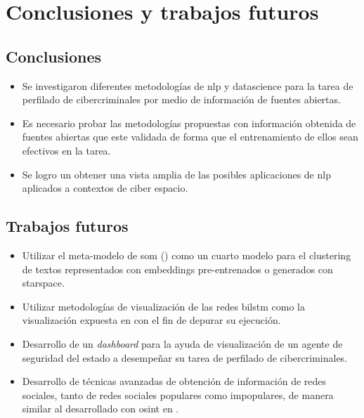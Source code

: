 \chapter{Conclusiones y trabajos futuros}

\label{chap:conclusions}

\section{Conclusiones}
\begin{itemize}
\item Se investigaron diferentes metodologías de \gls{nlp} y \gls{datascience} para la tarea de perfilado de cibercriminales por medio de información de fuentes abiertas.
\item Es necesario probar las metodologías propuestas con información obtenida de fuentes abiertas que este validada de forma que el entrenamiento de ellos sean efectivos en la tarea.
\item Se logro un obtener una vista amplia de las posibles aplicaciones de \gls{nlp} aplicados a contextos de ciber espacio.
\end{itemize}

\section{Trabajos futuros}
\begin{itemize}
\item Utilizar el meta-modelo de \gls{som} () como un cuarto modelo para el clustering de textos representados con embeddings pre-entrenados o generados con \gls{starspace}.
\item Utilizar metodologías de visualización de las redes \gls{bilstm} como la visualización expuesta en \cite{madsen2019visualizing} con el fin de depurar su ejecución.
\item Desarrollo de un \emph{dashboard} para la ayuda de visualización de un agente de seguridad del estado a desempeñar su tarea de perfilado de cibercriminales.
\item Desarrollo de técnicas avanzadas de obtención de información de redes sociales, tanto de redes sociales populares como impopulares, de manera similar al desarrollado con \gls{osint} en \cite{osint}.
\end{itemize}
